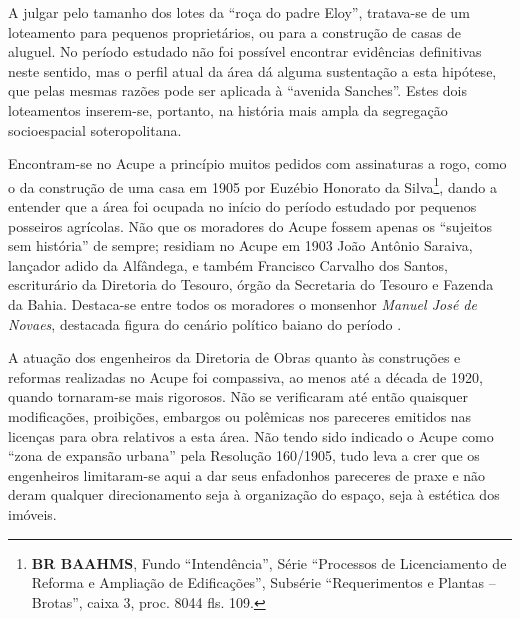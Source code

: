 A julgar pelo tamanho dos lotes da ``roça do padre Eloy'', tratava-se de um loteamento para pequenos proprietários, ou para a construção de casas de aluguel. No período estudado não foi possível encontrar evidências definitivas neste sentido, mas o perfil atual da área dá alguma sustentação a esta hipótese, que pelas mesmas razões pode ser aplicada à ``avenida Sanches''. Estes dois loteamentos inserem-se, portanto, na história mais ampla da segregação socioespacial soteropolitana.














Encontram-se no Acupe a princípio muitos pedidos com assinaturas a rogo, como o da construção de uma casa em 1905 por Euzébio Honorato da Silva\footnote{\textbf{BR BAAHMS}, Fundo ``Intendência'', Série ``Processos de Licenciamento de Reforma e Ampliação de Edificações'', Subsérie ``Requerimentos e Plantas -- Brotas'', caixa 3, proc. 8044 fls. 109.}, dando a entender que a área foi ocupada no início do período estudado por pequenos posseiros agrícolas. Não que os moradores do Acupe fossem apenas os ``sujeitos sem história'' de sempre; residiam no Acupe em 1903 João Antônio Saraiva, lançador adido da Alfândega, e também Francisco Carvalho dos Santos, escriturário da Diretoria do Tesouro, órgão da Secretaria do Tesouro e Fazenda da Bahia. Destaca-se entre todos os moradores o monsenhor \textit{Manuel José de Novaes}, destacada figura do cenário político baiano do período \cite{reis_almanak_1903}.


A atuação dos engenheiros da Diretoria de Obras quanto às construções e reformas realizadas no Acupe foi compassiva, ao menos até a década de 1920, quando tornaram-se mais rigorosos. Não se verificaram até então quaisquer modificações, proibições, embargos ou polêmicas nos pareceres emitidos nas licenças para obra relativos a esta área. Não tendo sido indicado o Acupe como ``zona de expansão urbana'' pela Resolução 160/1905, tudo leva a crer que os engenheiros limitaram-se aqui a dar seus enfadonhos pareceres de praxe e não deram qualquer direcionamento seja à organização do espaço, seja à estética dos imóveis.

